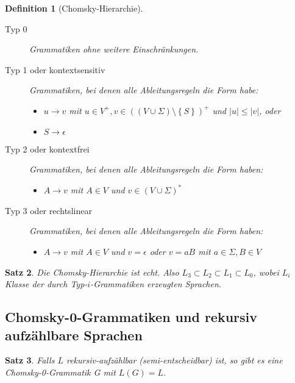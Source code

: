 \documentclass[11pt]{scrartcl}
\newcommand{\set}[1]{\left\lbrace #1\right\rbrace}
\theoremstyle{break}
\newtheorem{satz}{Satz}[section]
\newtheorem{defi}[satz]{Definition}
\begin{document}
    \begin{defi}[Chomsky-Hierarchie]
        \begin{description}
            \item[Typ 0] Grammatiken ohne weitere Einschränkungen.
            \item[Typ 1 oder kontextsensitiv] Grammatiken, bei denen alle Ableitungsregeln die Form habe:
            \begin{itemize}
                \item $u\rightarrow v$ mit $u\in V^+,v\in(\left(V\cup\Sigma\right)\setminus\set{S})^+$ und $|u|\leq |v|$, oder
                \item $S\rightarrow\epsilon$
            \end{itemize}
            \item[Typ 2 oder kontextfrei] Grammatiken, bei denen alle Ableitungsregeln die Form haben:
            \begin{itemize}
                \item $A\rightarrow v$ mit $A\in V$ und $v\in(V\cup\Sigma)^*$
            \end{itemize}
            \item[Typ 3 oder rechtslinear] Grammatiken, bei denen alle Ableitungsregeln die Form haben:
            \begin{itemize}
                \item $A\rightarrow v$ mit $A\in V$ und $v=\epsilon$ oder $v=aB$ mit $a\in\Sigma,B\in V$
            \end{itemize}
        \end{description}
    \end{defi}

    \begin{satz}
        Die Chomsky-Hierarchie ist echt.
        Also $L_3\subset L_2\subset L_1\subset L_0$, wobei $L_i$ Klasse der durch Typ-$i$-Grammatiken erzeugten Sprachen.
    \end{satz}


    \subsection{Chomsky-0-Grammatiken und rekursiv aufzählbare Sprachen}
	\label{subsec:chomsky-0-grammatiken-und-rekursiv-aufzählbare-sprachen}

    \begin{satz}
        Falls $L$ rekursiv-aufzählbar (semi-entscheidbar) ist, so gibt es eine Chomsky-0-Grammatik G mit $L(G)=L$.
    \end{satz}
\end{document}
